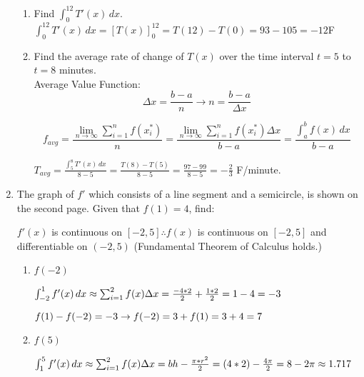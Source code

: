 \documentclass[10pt, letterpaper]{report}
\begin{document}
\begin{enumerate}
		\begin{enumerate}
			\item{Find $\int_{0}^{12}{T'(x)}\,dx$.} \\

				$\int_{0}^{12}{T'(x)}\,dx=
        [T(x)]_{0}^{12}=
        T(12)-T(0)=93-105=-12$\degree F \\

			\item{Find the average rate of change of $T(x)$ over the time interval $t=5$ to $t=8$ minutes.} \\

        Average Value Function:
        \[ \Delta x=\frac{b-a}{n}\rightarrow
        n=\frac{b-a}{\Delta x}\]

        \[f_{avg}={\frac{\lim_{n\to \infty}\sum_{i=1}^{n}f(x_{i}^{*})}{n}}=
        {\frac{\lim_{n\to \infty}\sum_{i=1}^{n}f(x_{i}^{*})\Delta x}{b-a}=
         \frac{\int_{a}^{b}{f(x)}\,dx}{b-a}} \]

				$T_{avg}=\frac{\int_{5}^{8}{T'(x)}\,dx}{8-5}=
        \frac{T(8)-T(5)}{8-5}=
        \frac{97-99}{8-5}=-\frac{2}{3}$ \degree F/minute.

		\end{enumerate}
	\item{The graph of $f'$ which consists of a line segment and a semicircle, is shown on the second page. Given that $f(1)=4$, find:\\}

    $f'(x)$ is continuous on $[-2,5]\therefore f(x)$ is continuous on $[-2,5]$ and differentiable on $(-2,5)$ (Fundamental Theorem of Calculus holds.) \\

		\begin{enumerate}
			\item{$f(-2)$\\}

				$\int_{-2}^{1}{f'(x)}\,dx\approx
        \sum_{i=1}^{2}f(x)\Delta x=
        \frac{-4*2}{2}+\frac{1*2}{2}=
        1-4=-3\\$

        $f(1)-f(-2)=-3\rightarrow
        f(-2)=3+f(1)=3+4=7\\$

			\item{$f(5)$\\}

				$\int_{1}^{5}{f'(x)}\,dx\approx
        \sum_{i=1}^{2}f(x)\Delta x=
        bh-\frac{\pi*r^2}{2}=
        (4*2)-\frac{4\pi}{2}=
        8-2\pi\approx1.717\\$


\end{enumerate}
\end{enumerate}
\end{document}
